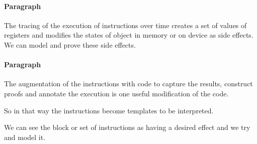 \documentclass{article}
\begin{document}
\paragraph{Paragraph}

The tracing of the execution of instructions over time
creates a set of values of registers and modifies the states
of object in memory or on device as side effects.
We can model and prove these side effects.

\paragraph{Paragraph}

The augmentation of the instructions with code
to capture the results, construct proofs and annotate the execution
is one useful modification of the code. 

So in that way the instructions become templates to be interpreted.

We can see the block or set of instructions as having a desired effect
and we try and model it. 


 
\end{document}
